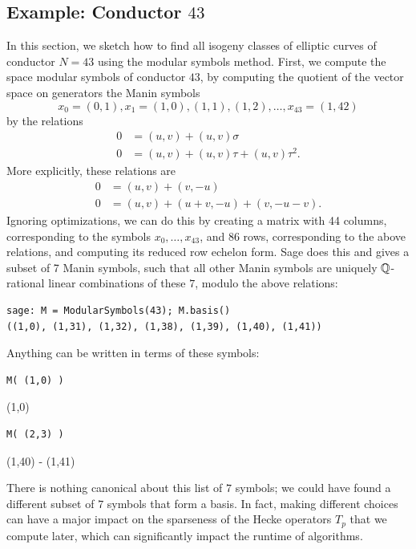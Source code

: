 \documentclass{book}
\begin{document}
\subsection{Example: Conductor $43$}

In this section, we sketch how to find all isogeny
classes of elliptic curves of conductor $N=43$
using the modular symbols method.
First, we compute the space modular symbols
of conductor $43$, by computing the quotient
of the vector space on generators
the Manin symbols
$$
x_0=(0,1),x_1=(1,0),(1,1),(1,2),\ldots, x_{43}=(1,42)
$$
by the relations
\begin{align*}
0 &=(u,v) + (u,v)\sigma \\
0 &=(u,v) + (u,v)\tau + (u,v)\tau^2.
\end{align*}
More explicitly, these relations are
\begin{align*}
0 &=(u,v) + (v, -u) \\
0 &=(u,v) + (u + v, -u) + (v, -u - v).
\end{align*}
Ignoring optimizations, we can do this by
creating a matrix with 44 columns, corresponding
to the symbols $x_0,\ldots, x_{43}$,
and 86 rows, corresponding to the above relations,
and computing its reduced row echelon form.
Sage does this and gives a subset
of 7 Manin symbols, such that all other Manin
symbols are uniquely $\mathbb{Q}$-rational linear
combinations of these $7$, modulo the above relations:
\begin{lstlisting}
sage: M = ModularSymbols(43); M.basis()
((1,0), (1,31), (1,32), (1,38), (1,39), (1,40), (1,41))
\end{lstlisting}
Anything can be written in terms of these symbols:
\begin{lstlisting}
M( (1,0) )
\end{lstlisting}
(1,0)
\begin{lstlisting}
M( (2,3) )
\end{lstlisting}
(1,40) - (1,41)

\begin{remark}
There is nothing canonical about this list of
$7$ symbols; we could have found a different subset
of $7$ symbols that form a basis.
In fact, making different choices can have a major
impact on the sparseness of the Hecke operators $T_p$
that we compute later, which can significantly
impact the runtime of algorithms.
\end{remark}
\end{document}
